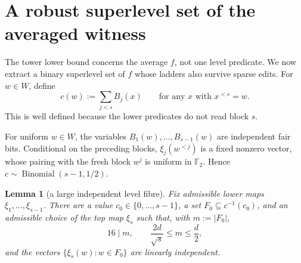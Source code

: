 \documentclass[10pt,a4paper]{amsart}
\newtheorem{lemma}[theorem]{Lemma}
\numberwithin{theorem}{section}
\newcommand{\F}{\mathbb{F}}
\newcommand{\abs}[1]{\lvert #1\rvert}
\begin{document}
\section{A robust superlevel set of the averaged witness}\label{sec:witness}

The tower lower bound concerns the average $f$, not one level predicate.  We
now extract a binary superlevel set of $f$ whose ladders also survive sparse
edits.  For $w\in W$, define
\[
  c(w):=\sum_{j<s}B_j(x)
  \qquad\text{for any $x$ with $x^{<s}=w$}.
\]
This is well defined because the lower predicates do not read block $s$.

For uniform $w\in W$, the variables $B_1(w),\dots,B_{s-1}(w)$ are
independent fair bits.  Conditional on the preceding blocks,
$\xi_j(w^{<j})$ is a fixed nonzero vector, whose pairing with the fresh block
$w^j$ is uniform in $\F_2$.  Hence
$c\sim\operatorname{Binomial}(s-1,1/2)$.

\begin{lemma}[a large independent level fibre]\label{lem:independent-fibre}
Fix admissible lower maps $\xi_1,\dots,\xi_{s-1}$.  There are a value
$c_0\in\{0,\dots,s-1\}$, a set $F_0\subseteq c^{-1}(c_0)$, and an admissible
choice of the top map $\xi_s$ such that, with $m:=\abs{F_0}$,
\[
  16\mid m,\qquad \frac{2d}{\sqrt{s}}\le m\le\frac d2,
\]
and the vectors $\{\xi_s(w):w\in F_0\}$ are linearly independent.
\end{lemma}
\end{document}
